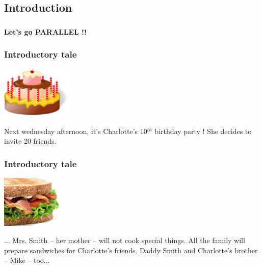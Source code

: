 
% 
%

\subsection{Introduction}

\begin{frame}[containsverbatim]
\frametitle{}
\begin{center}
\textbf{Let's go PARALLEL !!}
\end{center}
\end{frame}

\begin{frame}[containsverbatim]
\frametitle{Introductory tale}
\begin{center}
        {\includegraphics[height=2.5cm]{Day0/images/gateau.png}}
\end{center}
\begin{center}
Next wednesday afternoon, it's Charlotte's 10$^{th}$ birthday party ! She decides to invite 20 friends.
\end{center}
\end{frame}

\begin{frame}[containsverbatim]
\frametitle{Introductory tale}
\begin{center}
        {\includegraphics[height=2.5cm]{Day0/images/sandwich.jpg}}
\end{center}
\begin{center}
... Mrs. Smith -- her mother -- will not cook special things. All the family will prepare sandwiches for Charlotte's friends. Daddy Smith and Charlotte's brother -- Mike -- too... 
\end{center}
\end{frame}


